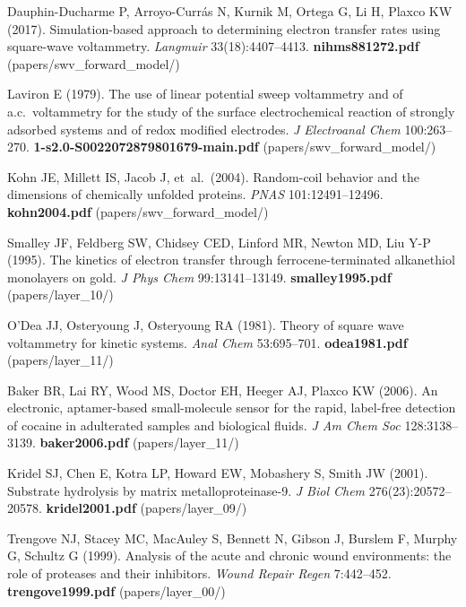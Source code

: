 \documentclass[10pt,a4paper]{article}
\numberwithin{equation}{section}
\begin{document}
\begin{enumerate}[label={[\arabic*]},noitemsep,leftmargin=*]
\item Dauphin-Ducharme P, Arroyo-Curr\'as N, Kurnik M, Ortega G, Li H, Plaxco KW (2017).
  Simulation-based approach to determining electron transfer rates using square-wave voltammetry.
  \textit{Langmuir} 33(18):4407--4413. \textbf{nihms881272.pdf} (papers/swv\_forward\_model/)

\item Laviron E (1979). The use of linear potential sweep voltammetry and of a.c.\ voltammetry
  for the study of the surface electrochemical reaction of strongly adsorbed systems and of redox
  modified electrodes. \textit{J Electroanal Chem} 100:263--270. \textbf{1-s2.0-S0022072879801679-main.pdf}
  (papers/swv\_forward\_model/)

\item Kohn JE, Millett IS, Jacob J, et~al.\ (2004). Random-coil behavior and the
  dimensions of chemically unfolded proteins.
  \textit{PNAS} 101:12491--12496. \textbf{kohn2004.pdf} (papers/swv\_forward\_model/)

\item Smalley JF, Feldberg SW, Chidsey CED, Linford MR, Newton MD, Liu Y-P (1995).
  The kinetics of electron transfer through ferrocene-terminated alkanethiol monolayers on gold.
  \textit{J Phys Chem} 99:13141--13149. \textbf{smalley1995.pdf} (papers/layer\_10/)

\item O'Dea JJ, Osteryoung J, Osteryoung RA (1981). Theory of square wave
  voltammetry for kinetic systems.
  \textit{Anal Chem} 53:695--701. \textbf{odea1981.pdf} (papers/layer\_11/)

\item Baker BR, Lai RY, Wood MS, Doctor EH, Heeger AJ, Plaxco KW (2006).
  An electronic, aptamer-based small-molecule sensor for the rapid, label-free detection of cocaine
  in adulterated samples and biological fluids. \textit{J Am Chem Soc} 128:3138--3139. \textbf{baker2006.pdf} (papers/layer\_11/)

\item Kridel SJ, Chen E, Kotra LP, Howard EW, Mobashery S, Smith JW (2001).
  Substrate hydrolysis by matrix metalloproteinase-9.
  \textit{J Biol Chem} 276(23):20572--20578. \textbf{kridel2001.pdf} (papers/layer\_09/)

  \noindent[7b] Trengove NJ, Stacey MC, MacAuley S, Bennett N, Gibson J, Burslem F, Murphy G, Schultz G (1999).
  Analysis of the acute and chronic wound environments: the role of proteases and their inhibitors.
  \textit{Wound Repair Regen} 7:442--452. \textbf{trengove1999.pdf} (papers/layer\_00/)


\end{enumerate}
\end{document}
